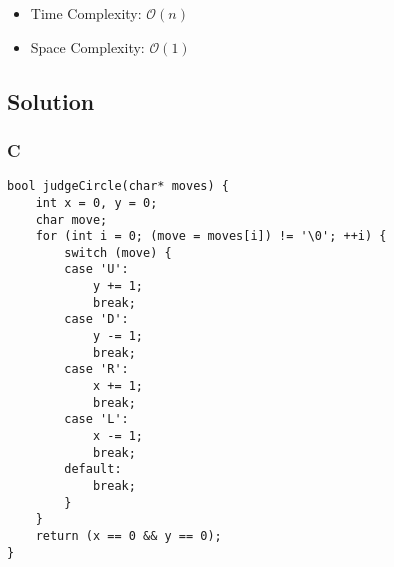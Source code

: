 \begin{itemize}
\item Time Complexity: $\mathcal{O}(n)$
\item Space Complexity: $\mathcal{O}(1)$
\end{itemize}

\subsection*{Solution}
\subsubsection*{C}
\begin{verbatim}
bool judgeCircle(char* moves) {
    int x = 0, y = 0;
    char move;
    for (int i = 0; (move = moves[i]) != '\0'; ++i) {
        switch (move) {
        case 'U':
            y += 1;
            break;
        case 'D':
            y -= 1;
            break;
        case 'R':
            x += 1;
            break;
        case 'L':
            x -= 1;
            break;
        default:
            break;
        }
    }
    return (x == 0 && y == 0);
}
\end{verbatim}

\newpage

